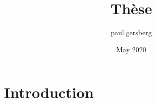 \documentclass{article}
\title{Thèse}
\author{paul.gersberg }
\date{May 2020}
\begin{document}
\maketitle

\section{Introduction}
\end{document}
